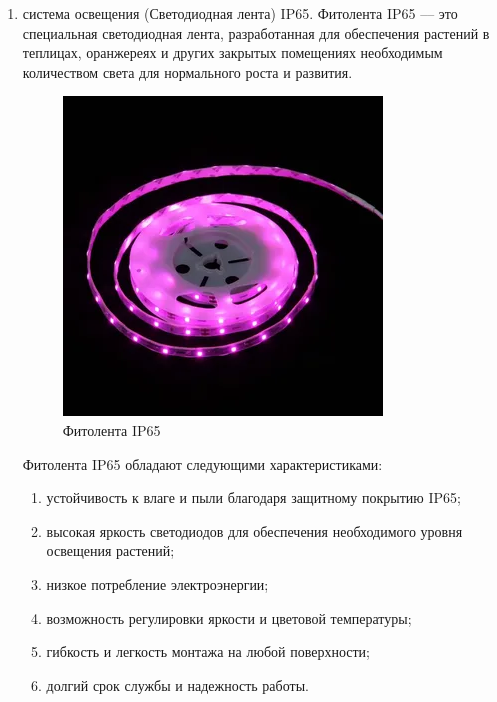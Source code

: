 \begin{enumerate}
    
    \item система освещения (Светодиодная лента) IP65. Фитолента IP65 –-- это специальная светодиодная лента, разработанная для обеспечения растений в теплицах, оранжереях и других закрытых помещениях необходимым количеством света для нормального роста и развития.

    \begin{figure}[H]
        \centering
        \includegraphics[scale=0.8]{images/ip65.png}
        \caption{Фитолента IP65}
        \label{fig:ip65}
    \end{figure}
    
    Фитолента IP65 обладают следующими характеристиками:
    
    \begin{enumerate}
        \item устойчивость к влаге и пыли благодаря защитному покрытию IP65;
        \item высокая яркость светодиодов для обеспечения необходимого уровня освещения растений;
        \item низкое потребление электроэнергии;
        \item возможность регулировки яркости и цветовой температуры;
        \item гибкость и легкость монтажа на любой поверхности;
        \item долгий срок службы и надежность работы.
    \end{enumerate}
\end{enumerate}

